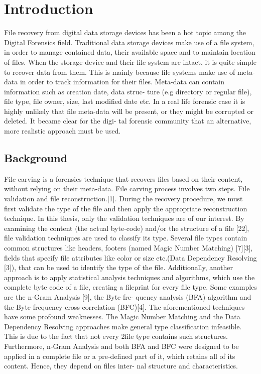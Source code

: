 \chapter{Introduction}
File recovery from digital data storage devices has been a hot topic among
the Digital Forensics field. Traditional data storage devices make use of a
file system, in order to manage contained data, their available space and to
maintain location of files. When the storage device and their file system are
intact, it is quite simple to recover data from them. This is mainly because
file systems make use of meta-data in order to track information for their
files. Meta-data can contain information such as creation date, data struc-
ture (e.g directory or regular file), file type, file owner, size, last modified
date etc. In a real life forensic case it is highly unlikely that file meta-data will be
present, or they might be corrupted or deleted. It became clear for the digi-
tal forensic community that an alternative, more realistic approach must be
used.

\section{Background}
File carving is a forensics technique that recovers files based on their content,
without relying on their meta-data. File carving process involves two steps.
File validation and file reconstruction.[1]. During the recovery procedure,
we must first validate the type of the file and then apply the appropriate
reconstruction technique. In this thesis, only the validation techniques are
of our interest.
By examining the content (the actual byte-code) and/or the structure of
a file [22], file validation techniques are used to classify its type. Several file
types contain common structures like headers, footers (named Magic Number
Matching) [7][3], fields that specify file attributes like color or size etc.(Data
Dependency Resolving [3]), that can be used to identify the type of the file.
Additionally, another approach is to apply statistical analysis techniques and
algorithms, which use the complete byte code of a file, creating a fileprint for
every file type. Some examples are the n-Gram Analysis [9], the Byte fre-
quency analysis (BFA) algorithm and the Byte frequency cross-correlation
(BFC)[4].
The aforementioned techniques have some profound weaknesses. The Magic
Number Matching and the Data Dependency Resolving approaches make
general type classification infeasible. This is due to the fact that not every
2file type contains such structures. Furthermore, n-Gram Analysis and both
BFA and BFC were designed to be applied in a complete file or a pre-defined
part of it, which retains all of its content. Hence, they depend on files inter-
nal structure and characteristics.
